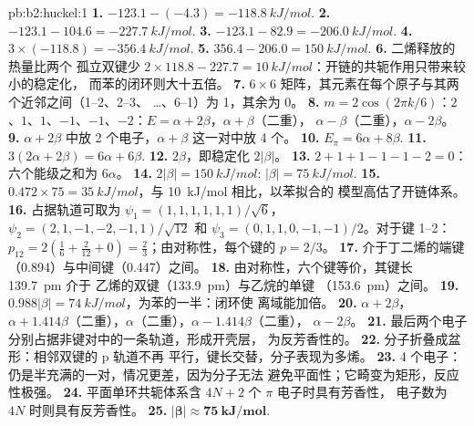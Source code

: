 \begin{solution}{pb:b2:huckel:1}
\textbf{1.} $-123.1 - (-4.3) = \qty{-118.8}{kJ/mol}$.
\textbf{2.} $-123.1 - 104.6 = \qty{-227.7}{kJ/mol}$.
\textbf{3.} $-123.1 - 82.9 = \qty{-206.0}{kJ/mol}$.
\textbf{4.} $3 \times (-118.8) = \qty{-356.4}{kJ/mol}$.
\textbf{5.} $356.4 - 206.0 = \qty{150}{kJ/mol}$.
\textbf{6.} 二烯释放的热量比两个
孤立双键少 $2 \times 118.8 - 227.7 = \qty{10}{kJ/mol}$：开链的共轭作用只带来较小的稳定化，
而苯的闭环则大十五倍。
\textbf{7.} $6 \times 6$ 矩阵，其元素在每个原子与其两个近邻之间（1--2、2--3、
\dots、6--1）为 1，其余为 0。
\textbf{8.} $m = 2\cos(2\pi k/6)$：$2$、$1$、$1$、$-1$、$-1$、$-2$：$E = \alpha + 2\beta$，$\alpha + \beta$（二重），
$\alpha - \beta$（二重），$\alpha - 2\beta$。
\textbf{9.} $\alpha + 2\beta$ 中放 2 个电子，$\alpha + \beta$ 这一对中放 4 个。
\textbf{10.} $E_\pi = 6\alpha + 8\beta$.
\textbf{11.} $3(2\alpha + 2\beta) = 6\alpha + 6\beta$.
\textbf{12.} $2\beta$，即稳定化 $2|\beta|$。
\textbf{13.} $2 + 1 + 1 - 1 - 1 - 2 = 0$：六个能级之和为 $6\alpha$。
\textbf{14.} $2|\beta| = \qty{150}{kJ/mol}$: $|\beta| = \qty{75}{kJ/mol}$.
\textbf{15.} $0.472 \times 75 = \qty{35}{kJ/mol}$，与 \qty{10}{kJ/mol} 相比，以苯拟合的
模型高估了开链体系。
\textbf{16.} 占据轨道可取为 $\psi_1 = (1, 1, 1, 1, 1, 1)/\sqrt6$，
$\psi_2 = (2, 1, -1, -2, -1, 1)/\sqrt{12}$ 和 $\psi_3 = (0, 1, 1, 0, -1, -1)/2$。对于键
1--2：$p_{12} = 2(\frac16 + \frac{2}{12} + 0) = \frac23$；由对称性，每个键的 $p = 2/3$。
\textbf{17.} 介于丁二烯的端键（0.894）与中间键（0.447）之间。
\textbf{18.} 由对称性，六个键等价，其键长 \qty{139.7}{pm} 介于
乙烯的双键（\qty{133.9}{pm}）与乙烷的单键
（\qty{153.6}{pm}）之间。
\textbf{19.} $0.988|\beta| = \qty{74}{kJ/mol}$，为苯的一半：闭环使
离域能加倍。
\textbf{20.} $\alpha + 2\beta$，$\alpha + 1.414\beta$（二重），$\alpha$（二重），$\alpha - 1.414\beta$（二重），
$\alpha - 2\beta$。
\textbf{21.} 最后两个电子分别占据非键对中的一条轨道，形成开壳层，
为反芳香性的。
\textbf{22.} 分子折叠成盆形：相邻双键的 p 轨道不再
平行，键长交替，分子表现为多烯。
\textbf{23.} 4 个电子：仍是半充满的一对，情况更差，因为分子无法
避免平面性；它畸变为矩形，反应性极强。
\textbf{24.} 平面单环共轭体系含 $4N + 2$ 个 $\pi$ 电子时具有芳香性，
电子数为 $4N$ 时则具有反芳香性。
\textbf{25.} $\boldsymbol{|\beta| \approx \qty{75}{kJ/mol}}$.
\end{solution}

